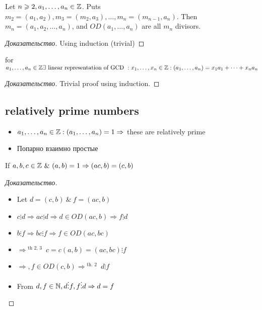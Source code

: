 \begin{theorem}[]
	Let $n \geqslant 2, a_1, \dots , a_n \in \mathbb{Z}$. Puts $m_2 = (a_1, a_2), m_3 = (m_2, a_3), \dots , m_n = (m_{n-1}, a_n)$. Then $m_n = (a_1, a_2, \dots , a_n)$, and $OD(a_1, \dots , a_n)$ are all $m_n$ divisors.
\end{theorem}

\begin{proof}[Доказательство]
	Using induction (trivial)
\end{proof}

\begin{corollary}[]
	for $a_1, \dots , a_n \in \mathbb{Z} \exists \text{ linear representation of GCD }: x_1, \dots , x_n \in \mathbb{Z}: (a_1, \dots , a_n)= x_1a_1+ \dots + x_n a_n $
\end{corollary}

\begin{proof}[Доказательство]
	Trivial proof using induction.
\end{proof}

\subsection{relatively prime numbers}

\begin{definition}[]
	\begin{itemize}
		\item  $a_1, \dots , a_n \in \mathbb{Z}: (a_1, \dots , a_n) = 1 \Rightarrow $ these are relatively prime 
		\item Попарно взаимно простые 
	\end{itemize}
\end{definition}

\begin{property}[]
	If  $a,b,c \in \mathbb{Z} \ \& \ (a,b) = 1 \Rightarrow (ac, b) = (c, b)$
\end{property}

\begin{proof}[Доказательство]
	\begin{itemize}
		\item Let $d = (c,b) \ \& \ f = (ac, b)$
		\item $c \vdots d \Rightarrow ac \vdots d \Rightarrow d \in OD(ac, b) \Rightarrow f \vdots d$
		\item $b \vdots f \Rightarrow bc \vdots f \Rightarrow f \in OD(ac, bc)$
		\item $ \Rightarrow ^{\text{ th 2, 3 } } c = c(a,b) = (ac, bc) \vdots f$ 
		\item $ \Rightarrow, f \in OD(c,b) \Rightarrow ^{\text{ th. 2 } } d \vdots f$
		\item From $d,f \in \mathbb{N}, d \vdots f, f \vdots d \Rightarrow d = f$ 
	\end{itemize}
\end{proof}

